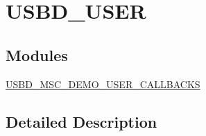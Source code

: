 \hypertarget{group___u_s_b_d___u_s_e_r}{\section{U\-S\-B\-D\-\_\-\-U\-S\-E\-R}
\label{group___u_s_b_d___u_s_e_r}
}
\subsection*{Modules}
\begin{DoxyCompactItemize}
\item 
\hyperlink{group___u_s_b_d___m_s_c___d_e_m_o___u_s_e_r___c_a_l_l_b_a_c_k_s}{U\-S\-B\-D\-\_\-\-M\-S\-C\-\_\-\-D\-E\-M\-O\-\_\-\-U\-S\-E\-R\-\_\-\-C\-A\-L\-L\-B\-A\-C\-K\-S}
\end{DoxyCompactItemize}


\subsection{Detailed Description}
